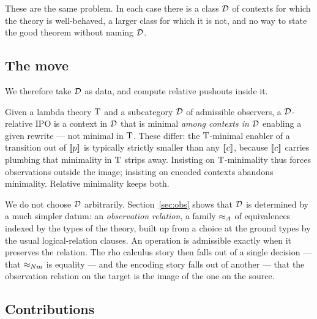 \documentclass{article}
\begin{document}
These are the same problem. In each case there is a class $\mathcal{D}$ of contexts for which the theory is well-behaved, a larger class for which it is not, and no way to state the good theorem without naming $\mathcal{D}$.

\subsection{The move}

We therefore take $\mathcal{D}$ as data, and compute relative pushouts inside it.

Given a lambda theory $\mathrm{T}$ and a subcategory $\mathcal{D}$ of admissible observers, a $\mathcal{D}$-relative IPO is a context in $\mathcal{D}$ that is minimal \emph{among contexts in $\mathcal{D}$} enabling a given rewrite --- not minimal in $\mathrm{T}$. These differ: the $\mathrm{T}$-minimal enabler of a transition out of $[\![p]\!]$ is typically strictly smaller than any $[\![c]\!]$, because $[\![c]\!]$ carries plumbing that minimality in $\mathrm{T}$ strips away. Insisting on $\mathrm{T}$-minimality thus forces observations outside the image; insisting on encoded contexts abandons minimality. Relative minimality keeps both.

We do not choose $\mathcal{D}$ arbitrarily. Section~\ref{sec:obs} shows that $\mathcal{D}$ is determined by a much simpler datum: an \emph{observation relation}, a family $\approx_{A}$ of equivalences indexed by the types of the theory, built up from a choice at the ground types by the usual logical-relation clauses. An operation is admissible exactly when it preserves the relation. The rho calculus story then falls out of a single decision --- that $\approx_{Nm}$ is equality --- and the encoding story falls out of another --- that the observation relation on the target is the image of the one on the source.

\subsection{Contributions}
\end{document}
